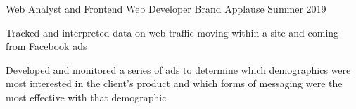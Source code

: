 \begin{cventries}
{\begin{cvitems}
      \end{cvitems}
    }
    \cventry
    {Web Analyst and Frontend Web Developer}
    {Brand Applause}
    {}
    {Summer 2019}
    {
      \begin{cvitems}
        \item {Tracked and interpreted data on web traffic moving within a site and coming from Facebook ads}
        \item {Developed and monitored a series of ads to determine which demographics were most interested in the client's product and which forms of messaging were the most effective with that demographic}
      \end{cvitems}
    }

\end{cventries}
